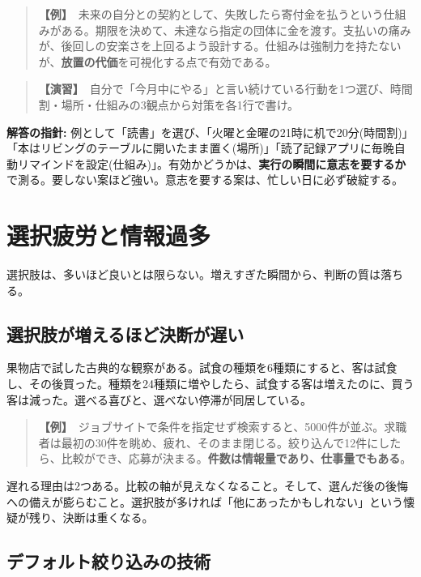 \documentclass{article}
\begin{document}
\begin{quote}
\textbf{【例】}\ 未来の自分との契約として、失敗したら寄付金を払うという仕組みがある。期限を決めて、未達なら指定の団体に金を渡す。支払いの痛みが、後回しの安楽さを上回るよう設計する。仕組みは強制力を持たないが、\textbf{放置の代価}を可視化する点で有効である。
\end{quote}

\begin{quote}
\textbf{【演習】}\ 自分で「今月中にやる」と言い続けている行動を1つ選び、時間割・場所・仕組みの3観点から対策を各1行で書け。
\end{quote}

\textbf{解答の指針:} 例として「読書」を選び、「火曜と金曜の21時に机で20分(時間割)」「本はリビングのテーブルに開いたまま置く(場所)」「読了記録アプリに毎晩自動リマインドを設定(仕組み)」。有効かどうかは、\textbf{実行の瞬間に意志を要するか}で測る。要しない案ほど強い。意志を要する案は、忙しい日に必ず破綻する。

\section{選択疲労と情報過多}

選択肢は、多いほど良いとは限らない。増えすぎた瞬間から、判断の質は落ちる。

\subsection{選択肢が増えるほど決断が遅い}

果物店で試した古典的な観察がある。試食の種類を6種類にすると、客は試食し、その後買った。種類を24種類に増やしたら、試食する客は増えたのに、買う客は減った。選べる喜びと、選べない停滞が同居している。

\begin{quote}
\textbf{【例】}\ ジョブサイトで条件を指定せず検索すると、5000件が並ぶ。求職者は最初の30件を眺め、疲れ、そのまま閉じる。絞り込んで12件にしたら、比較ができ、応募が決まる。\textbf{件数は情報量であり、仕事量でもある}。
\end{quote}

遅れる理由は2つある。比較の軸が見えなくなること。そして、選んだ後の後悔への備えが膨らむこと。選択肢が多ければ「他にあったかもしれない」という懐疑が残り、決断は重くなる。

\subsection{デフォルト絞り込みの技術}
\end{document}
